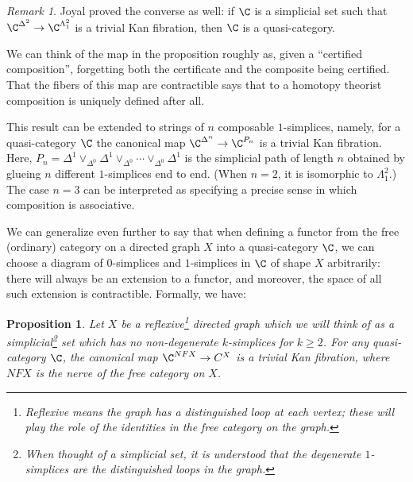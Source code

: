 \documentclass[12pt]{amsart}
\newtheorem{proposition}[theorem]{Proposition}
\theoremstyle{definition} \newtheorem{definition}[theorem]{Definition}
\theoremstyle{remark} \newtheorem{remark}[theorem]{Remark}
\numberwithin{equation}{section}
\begin{document}
\begin{remark}
  Joyal proved the converse as well: if $\C$ is a simplicial set
  such that $\C^{\Delta^2} \to \C^{\Lambda^2_1}$ is a trivial Kan
  fibration, then $\C$ is a quasi-category.
\end{remark}

We can think of the map in the proposition roughly as, given a
``certified composition'', forgetting both the certificate and the
composite being certified. That the fibers of this map are
contractible says that to a homotopy theorist composition is uniquely
defined after all.

This result can be extended to strings of $n$ composable
$1$-simplices, namely, for a quasi-category $\C$ the canonical map
$\C^{\Delta^n} \to \C^{P_n}$ is a trivial Kan fibration. Here, $P_n =
\Delta^1 \vee_{\Delta^0} \Delta^1 \vee_{\Delta^0} \cdots
\vee_{\Delta^0} \Delta^1$ is the simplicial path of length $n$
obtained by glueing $n$ different $1$-simplices end to end. (When
$n=2$, it is isomorphic to $\Lambda^2_1$.) The case $n=3$ can be
interpreted as specifying a precise sense in which composition is
associative.

We can generalize even further to say that when defining a functor
from the free (ordinary) category on a directed graph $X$ into a
quasi-category $\C$, we can choose a diagram of $0$-simplices and
$1$-simplices in $\C$ of shape $X$ arbitrarily: there will always be
an extension to a functor, and moreover, the space of all such
extension is contractible. Formally, we have:

\begin{proposition}\label{freecats}
Let $X$ be a reflexive\footnote{Reflexive means
the graph has a distinguished loop at each vertex; these will play the
role of the identities in the free category on the graph.} directed
graph which we will think of as a simplicial\footnote{When thought of
a simplicial set, it is understood that the degenerate $1$-simplices
are the distinguished loops in the graph.} set which has no
non-degenerate $k$-simplices for $k \ge 2$. For any quasi-category
$\C$, the canonical map $\C^{NFX} \to C^X$ is a trivial Kan fibration,
where $NFX$ is the nerve of the free category on $X$.
\end{proposition}
\end{document}
